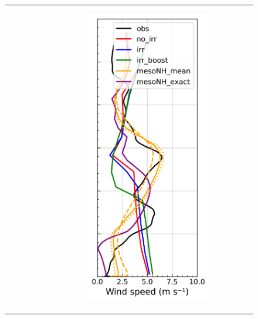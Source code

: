 \begin{figure}[hbtp]
{\begin{tabular}{@{}cccc@{}}
\begin{subfigure}[t]{0.283\textwidth}
        \end{subfigure} &
        \begin{subfigure}[t]{0.283\textwidth}
            \caption{}
            \includegraphics[width=\textwidth]{images/chap6/profiles/profile_cendrosa_wind_speed_2007_sensbins.png}

\end{subfigure}
\end{tabular}}
\end{figure}
